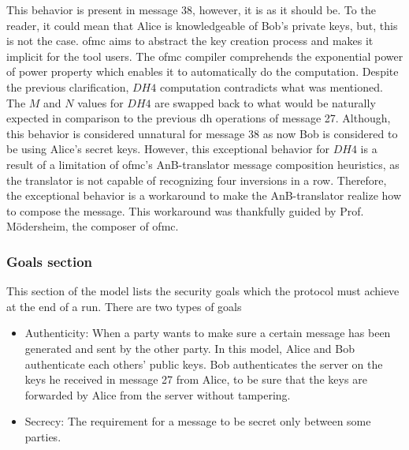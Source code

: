 This behavior is present in message 38, however, it is as it should be. To the reader, it could mean that Alice is knowledgeable of Bob's private keys, but, this is not the case. \gls{ofmc} aims to abstract the key creation process and makes it implicit for the tool users. The \gls{ofmc} compiler comprehends the exponential power of power property which enables it to automatically do the computation. Despite the previous clarification, $DH4$ computation contradicts what was mentioned. The $M$ and $N$ values for $DH4$ are swapped back to what would be naturally expected in comparison to the previous \gls{dh} operations of message 27. Although, this behavior is considered unnatural for message 38 as now Bob is considered to be using Alice's secret keys. However, this exceptional behavior for $DH4$ is a result of a limitation of \gls{ofmc}'s AnB-translator message composition heuristics, as the translator is not capable of recognizing four inversions in a row. Therefore, the exceptional behavior is a workaround to make the AnB-translator realize how to compose the message. This workaround was thankfully guided by Prof. M\"{o}dersheim, the composer of \gls{ofmc}.
\subsubsection{Goals section}
This section of the model lists the security goals which the protocol must achieve at the end of a run. There are two types of goals
\begin{itemize}
	\item Authenticity: When a party wants to make sure a certain message has been generated and sent by the other party. In this model, Alice and Bob authenticate each others' public keys. Bob authenticates the server on the keys he received in message 27 from Alice, to be sure that the keys are forwarded by Alice from the server without tampering.
	\item Secrecy: The requirement for a message to be secret only between some parties.
\end{itemize}

%



